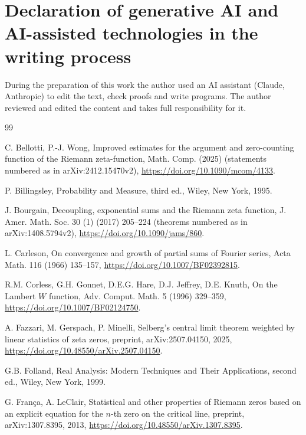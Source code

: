 \documentclass[preprint,12pt]{elsarticle}
\numberwithin{equation}{section}
\theoremstyle{plain}
\theoremstyle{definition}
\theoremstyle{remark}
\begin{document}
\section*{Declaration of generative AI and AI-assisted technologies in the writing process}
During the preparation of this work the author used an AI assistant (Claude, Anthropic) to edit the text, check proofs and write programs. The author reviewed and edited the content and takes full responsibility for it.


\begin{thebibliography}{99}

C. Bellotti, P.-J. Wong, Improved estimates for the argument and zero-counting function of the Riemann zeta-function, Math. Comp. (2025) (statements numbered as in arXiv:2412.15470v2), \href{https://doi.org/10.1090/mcom/4133}{https://doi.org/10.1090/mcom/4133}.

P. Billingsley, Probability and Measure, third ed., Wiley, New York, 1995.

J. Bourgain, Decoupling, exponential sums and the Riemann zeta function, J. Amer. Math. Soc. 30 (1) (2017) 205--224 (theorems numbered as in arXiv:1408.5794v2), \href{https://doi.org/10.1090/jams/860}{https://doi.org/10.1090/jams/860}.

L. Carleson, On convergence and growth of partial sums of Fourier series, Acta Math. 116 (1966) 135--157, \href{https://doi.org/10.1007/BF02392815}{https://doi.org/10.1007/BF02392815}.

R.M. Corless, G.H. Gonnet, D.E.G. Hare, D.J. Jeffrey, D.E. Knuth, On the Lambert $W$ function, Adv. Comput. Math. 5 (1996) 329--359, \href{https://doi.org/10.1007/BF02124750}{https://doi.org/10.1007/BF02124750}.

A. Fazzari, M. Gerspach, P. Minelli, Selberg's central limit theorem weighted by linear statistics of zeta zeros, preprint, arXiv:2507.04150, 2025, \href{https://doi.org/10.48550/arXiv.2507.04150}{https://doi.org/10.48550/arXiv.2507.04150}.

G.B. Folland, Real Analysis: Modern Techniques and Their Applications, second ed., Wiley, New York, 1999.

G. Fran\c{c}a, A. LeClair, Statistical and other properties of Riemann zeros based on an explicit equation for the $n$-th zero on the critical line, preprint, arXiv:1307.8395, 2013, \href{https://doi.org/10.48550/arXiv.1307.8395}{https://doi.org/10.48550/arXiv.1307.8395}.


\end{thebibliography}
\end{document}
